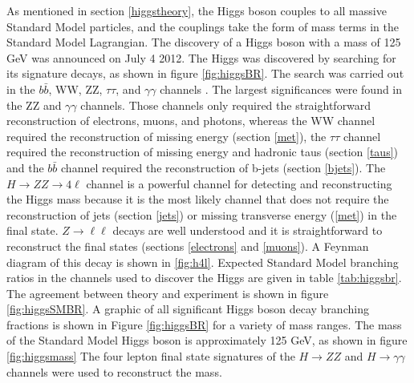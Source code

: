 \documentclass[oneside, letterpaper, oldfontcommands]{memoir}
\begin{document}
\qquad As mentioned in section \ref{higgstheory}, the Higgs boson couples to all massive Standard Model particles, and the couplings take the form of mass terms in the Standard Model Lagrangian. The discovery of a Higgs boson with a mass of 125 GeV was announced on July 4 2012. The Higgs was discovered by searching for its signature decays, as shown in figure \ref{fig:higgsBR}. The search was carried out in the $b\bar{b}$, WW, ZZ, $\tau\tau$, and $\gamma\gamma$ channels \cite{Khachatryan:2016vau}. The largest significances were found in the ZZ and $\gamma\gamma$ channels. Those channels only required the straightforward reconstruction of electrons, muons, and photons, whereas the WW channel required the reconstruction of missing energy (section \ref{met}), the $\tau\tau$ channel required the reconstruction of missing energy and hadronic taus (section \ref{taus}) and the $b\bar{b}$ channel required the reconstruction of b-jets (section \ref{bjets}). The $H \rightarrow ZZ \rightarrow 4 \ell$ channel is a powerful channel for detecting and reconstructing the Higgs mass because it is the most likely channel that does not require the reconstruction of jets (section \ref{jets}) or missing transverse energy (\ref{met}) in the final state. $Z \rightarrow \ell \ell$ decays are well understood and it is straightforward to reconstruct the final states (sections \ref{electrons} and \ref{muons}). A Feynman diagram of this decay is shown in \ref{fig:h4l}. Expected Standard Model branching ratios in the channels used to discover the Higgs are given in table \ref{tab:higgsbr}. The agreement between theory and experiment is shown in figure \ref{fig:higgsSMBR}. A graphic of all significant Higgs boson decay branching fractions is shown in Figure \ref{fig:higgsBR}\cite{Heinemeyer:2013tqa} for a variety of mass ranges. The mass of the Standard Model Higgs boson is approximately 125 GeV, as shown in figure \ref{fig:higgsmass} The four lepton final state signatures of the $H \rightarrow ZZ$ and $H \rightarrow \gamma\gamma$ channels were used to reconstruct the mass.

%    
\end{document}
